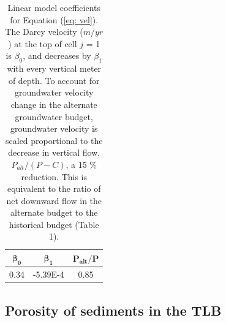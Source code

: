 \begin{table}[H]
	
	\caption{Linear model coefficients for Equation (\ref{eq: vel}). The Darcy velocity ($m/yr$) at the top of cell $j$ = 1 is $\beta_0$, and decreases by $\beta_1$ with every vertical meter of depth. To account for groundwater velocity change in the alternate groundwater budget, groundwater velocity is scaled proportional to the decrease in vertical flow, $P_{alt}/(P - C)$, a 15 \% reduction. This is equivalent to the ratio of net downward flow in the alternate budget to the historical budget (Table 1).}
	
	\centering
	
	\begin{tabular}{ccc}
		
		$\bm{\beta_0}$ & $\bm{\beta_1}$ & $\bm{P_{alt}/P}$ \\ 
		\hline
		0.34 & -5.39E-4 & 0.85 \\ 
		\hline
	\end{tabular}
	
	\label{ap_b_velocity_coefficients}
\end{table}
\egroup




\subsection{Porosity of sediments in the TLB}


\bgroup

\renewcommand{\arraystretch}{1.0}

\setlength{\tabcolsep}{1.0em}

